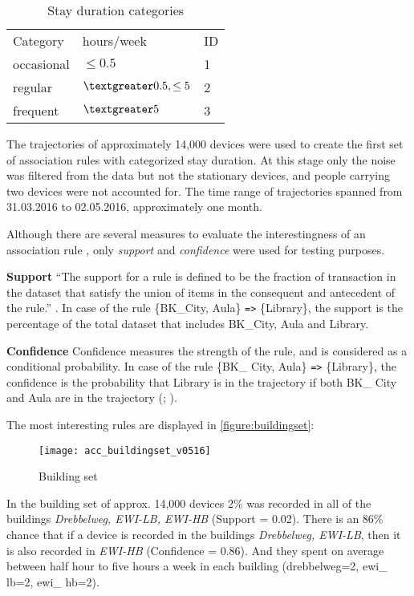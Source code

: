 \begin{table}[H]
\centering
\captionsetup{justification=centering}
\caption{Stay duration categories}
\label{table:stay duration categories}
\begin{tabular}{lll}
\cline{1-3}
Category   & hours/week             & ID \\ \cline{1-3}
occasional & $\leq 0.5$                 & 1  \\
regular & $\textgreater 0.5, \leq 5$ & 2  \\
frequent   & $\textgreater 5$           & 3
\end{tabular}
\end{table}

The trajectories of approximately 14,000 devices were used to create the first
set of association rules with categorized stay duration. At this stage only the
noise was filtered from the data but not the stationary devices, and people
carrying two devices were not accounted for. The time range of trajectories
spanned from 31.03.2016 to 02.05.2016, approximately one month.

Although there are several measures to evaluate the interestingness of an
association rule \cite{zhang_survey_2009}, only \textit{support} and
\textit{confidence} were used for testing purposes.

\textbf{Support}
“The support for a rule is defined to be the fraction of transaction in the
dataset that satisfy the union of items in the consequent and antecedent of the
rule.” \cite{agrawal_mining_1993}. In case of the rule \{BK\_City, Aula\}
\verb|=>| \{Library\}, the support is the percentage of the total dataset that
includes BK\_City, Aula and Library.

\textbf{Confidence}
Confidence measures the strength of the rule, and is considered as a
conditional probability. In case of the rule \{BK\_ City, Aula\} \verb|=>|
\{Library\}, the confidence is the probability that Library is in the
trajectory if both BK\_ City and Aula are in the trajectory
(\cite{agrawal_mining_1993}; \cite{anbukkarasy_interesting_2013}).

The most interesting rules are displayed in \autoref{figure:buildingset}:
\begin{figure}[H]
\centering
\texttt{[image: acc\_buildingset\_v0516]}
\captionsetup{justification=centering}
\caption{Building set}
\label{figure:buildingset}
\end{figure}

In the building set of approx. 14,000 devices 2\% was recorded in all of the buildings \textit{Drebbelweg, EWI-LB, EWI-HB} (Support = 0.02). There is an
86\% chance that if a device is recorded in the buildings \textit{Drebbelweg, EWI-LB}, then it is also recorded in \textit{EWI-HB} (Confidence = 0.86). And
they spent on average between half hour to five hours a week in each building (drebbelweg=2, ewi\_ lb=2, ewi\_ hb=2).

